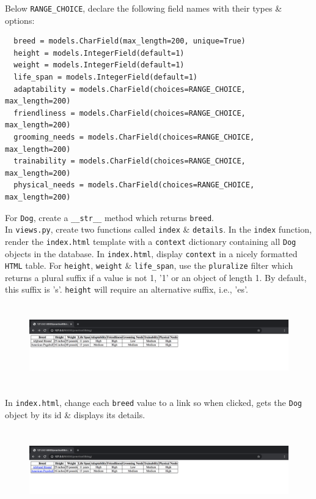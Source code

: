 \documentclass{article}
\begin{document}
Below \texttt{RANGE\_CHOICE}, declare the following field names with their types \& options: 
\begin{verbatim}
  breed = models.CharField(max_length=200, unique=True) 
  height = models.IntegerField(default=1) 
  weight = models.IntegerField(default=1) 
  life_span = models.IntegerField(default=1) 
  adaptability = models.CharField(choices=RANGE_CHOICE, max_length=200) 
  friendliness = models.CharField(choices=RANGE_CHOICE, max_length=200) 
  grooming_needs = models.CharField(choices=RANGE_CHOICE, max_length=200) 
  trainability = models.CharField(choices=RANGE_CHOICE, max_length=200) 
  physical_needs = models.CharField(choices=RANGE_CHOICE, max_length=200) 
\end{verbatim}

For \texttt{Dog}, create a \texttt{\_\_str\_\_} method which returns \texttt{breed}. \\

In \texttt{views.py}, create two functions called \texttt{index} \& \texttt{details}. In the \texttt{index} function, render the \texttt{index.html} template with a \texttt{context} dictionary containing all \texttt{Dog} objects in the database. In \texttt{index.html}, display \texttt{context} in a nicely formatted \texttt{HTML} table. For \texttt{height}, \texttt{weight} \& \texttt{life\_span}, use the \texttt{pluralize} filter which returns a plural suffix if a value is not 1, '1' or an object of length 1. By default, this suffix is 's'. \texttt{height} will require an alternative suffix, i.e., 'es'. 

\begin{figure}[H]
  \includegraphics[width=175mm, height=35mm]{./img/08-expected-dog-1.png}
\end{figure}

In \texttt{index.html}, change each \texttt{breed} value to a link so when clicked, gets the \texttt{Dog} object by its id \& displays its details.

\begin{figure}[H]
  \includegraphics[width=175mm, height=35mm]{./img/08-expected-dog-2.png}
\end{figure} 
\end{document}
